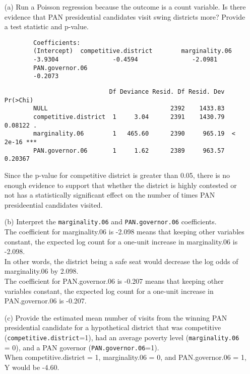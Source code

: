 \documentclass[12pt,letterpaper]{article}
\begin{document}
\begin{enumerate}
	\item [(a)]
	Run a Poisson regression because the outcome is a count variable. Is there evidence that PAN presidential candidates visit swing districts more? Provide a test statistic and p-value.\\
	 
	\begin{footnotesize}
		\begin{verbatim}
		Coefficients:
		(Intercept)  competitive.district        marginality.06  
		-3.9304               -0.4594               -2.0981  
		PAN.governor.06  
		-0.2073  
		\end{verbatim}
	\end{footnotesize}
	 
		\begin{footnotesize}
		\begin{verbatim}
		                     Df Deviance Resid. Df Resid. Dev Pr(>Chi)    
		NULL                                  2392    1433.83             
		competitive.district  1     3.04      2391    1430.79  0.08122 .  
		marginality.06        1   465.60      2390     965.19  < 2e-16 ***
		PAN.governor.06       1     1.62      2389     963.57  0.20367 
		\end{verbatim}
	\end{footnotesize}
	Since the p-value for competitive district is greater than 0.05, there is no enough evidence to support that
	whether the district is highly contested or not has a statistically significant effect on the number of times PAN presideential candidates visited.\\
	\item [(b)]
	Interpret the \texttt{marginality.06} and \texttt{PAN.governor.06} coefficients.\\
	
	The coefficient for marginality.06 is -2.098 means that keeping other variables constant, the expected log count for a one-unit increase in marginality.06 is -2.098.\\
	In other words, the district being a safe seat would decrease the log odds of marginality.06 by 2.098.\\
	The coefficient for PAN.governor.06 is -0.207 means that keeping other variables constant, the expected log count for a one-unit increase in PAN.governor.06 is -0.207.\\
	
	
	\item [(c)]
	Provide the estimated mean number of visits from the winning PAN presidential candidate for a hypothetical district that was competitive (\texttt{competitive.district}=1), had an average poverty level (\texttt{marginality.06} = 0), and a PAN governor (\texttt{PAN.governor.06}=1).\\
	 
	When competitive.district = 1, marginality.06 = 0, and PAN.governor.06 = 1, Y would be -4.60.
	
\end{enumerate}
	
\end{document}
